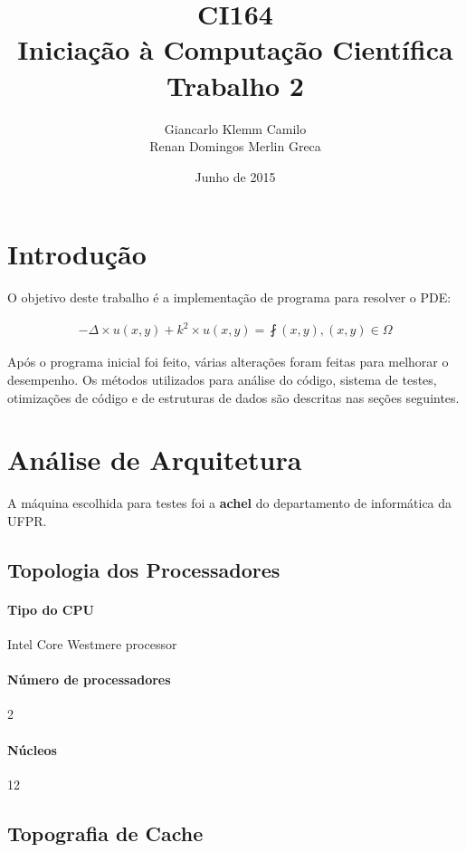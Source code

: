 \documentclass[12pt]{article}
\title{CI164\\Iniciação à Computação Científica\\Trabalho 2}
\author{
	Giancarlo Klemm Camilo \\
	Renan Domingos Merlin Greca
}
\date{Junho de 2015}
\begin{document}
\maketitle
\newpage	

\tableofcontents
\newpage

\section{Introdução}
O objetivo deste trabalho é a implementação de programa para resolver o PDE:

\begin{align}
	- \Delta \times u(x,y) + k^2 \times u(x,y) = \fint(x,y), (x,y) \in \Omega
\end{align}

Após o programa inicial foi feito, várias alterações foram feitas para melhorar o desempenho. Os métodos utilizados para análise do código, sistema de testes, otimizações de código e de estruturas de dados são descritas nas seções seguintes.

\newpage

\section{Análise de Arquitetura}
A máquina escolhida para testes foi a \textbf{achel} do departamento de informática da UFPR.

\subsection{Topologia dos Processadores}
\paragraph{Tipo do CPU} Intel Core Westmere processor
\paragraph{Número de processadores} 2
\paragraph{Núcleos} 12

\subsection{Topografia de Cache}
\end{document}
